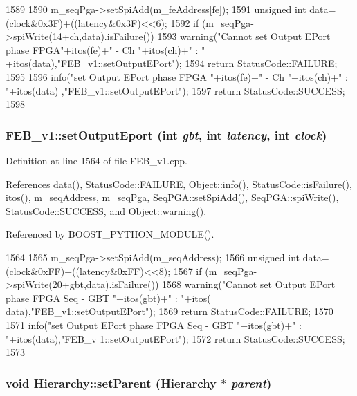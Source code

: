 \begin{DoxyCode}
1589                                                                        {
1590   m_seqPga->setSpiAdd(m_feAddress[fe]);
1591   unsigned int data=(clock&0x3F)+((latency&0x3F)<<6);
1592   if (m_seqPga->spiWrite(14+ch,data).isFailure()){
1593     warning("Cannot set Output EPort phase FPGA"+itos(fe)+" - Ch "+itos(ch)+" : "
      +itos(data),"FEB_v1::setOutputEPort");
1594     return StatusCode::FAILURE;
1595   }
1596   info("set Output EPort phase FPGA "+itos(fe)+" - Ch "+itos(ch)+" : "+itos(data)
      ,"FEB_v1::setOutputEPort");
1597   return StatusCode::SUCCESS;
1598 }
\end{DoxyCode}
\hypertarget{classFEB__v1_ae94205e374c3438e910aa39a889ebf5c}{
\subsubsection[{setOutputEport}]{ FEB\_\-v1::setOutputEport (int {\em gbt}, \/  int {\em latency}, \/  int {\em clock})}}
\label{classFEB__v1_ae94205e374c3438e910aa39a889ebf5c}


Definition at line 1564 of file FEB\_\-v1.cpp.

References data(), StatusCode::FAILURE, Object::info(), StatusCode::isFailure(), itos(), m\_\-seqAddress, m\_\-seqPga, SeqPGA::setSpiAdd(), SeqPGA::spiWrite(), StatusCode::SUCCESS, and Object::warning().

Referenced by BOOST\_\-PYTHON\_\-MODULE().


\begin{DoxyCode}
1564                                                                 {
1565   m_seqPga->setSpiAdd(m_seqAddress);
1566   unsigned int data=(clock&0xFF)+((latency&0xFF)<<8);
1567   if (m_seqPga->spiWrite(20+gbt,data).isFailure()){
1568     warning("Cannot set Output EPort phase FPGA Seq - GBT "+itos(gbt)+" : "+itos(
      data),"FEB_v1::setOutputEPort");
1569     return StatusCode::FAILURE;
1570   }
1571   info("set Output EPort phase FPGA Seq - GBT "+itos(gbt)+" : "+itos(data),"FEB_v
      1::setOutputEPort");
1572   return StatusCode::SUCCESS;
1573 }
\end{DoxyCode}
\hypertarget{classHierarchy_a585ad1aeec16077a0e532ab8b4fc557b}{
\subsubsection[{setParent}]{\setlength{\rightskip}{0pt plus 5cm}void Hierarchy::setParent ({\bf Hierarchy} $\ast$ {\em parent})}}
\label{classHierarchy_a585ad1aeec16077a0e532ab8b4fc557b}


